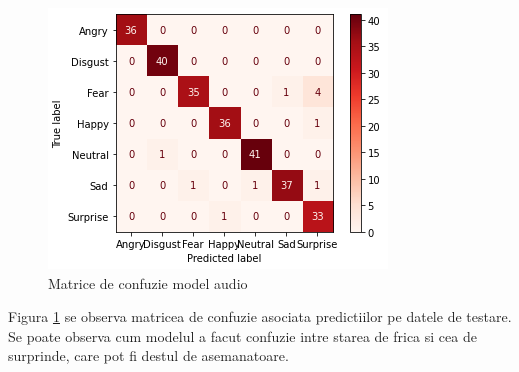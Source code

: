 \documentclass[a4paper, 12pt]{report}
\begin{document}
	\begin{figure}[H]
		\begin{center}
			\includegraphics[scale=0.7]{images/audio_confusion_matrix.png}
		\end{center}
		\caption{Matrice de confuzie model audio}
		\label{fig:audio_confusion_matrix}
	\end{figure}

	Figura \ref{fig:audio_confusion_matrix} se observa matricea de confuzie asociata predictiilor pe datele de testare. Se poate observa cum modelul a facut confuzie intre starea de frica si cea de surprinde, care pot fi destul de asemanatoare.
	
	
	\clearpage
\end{document}
